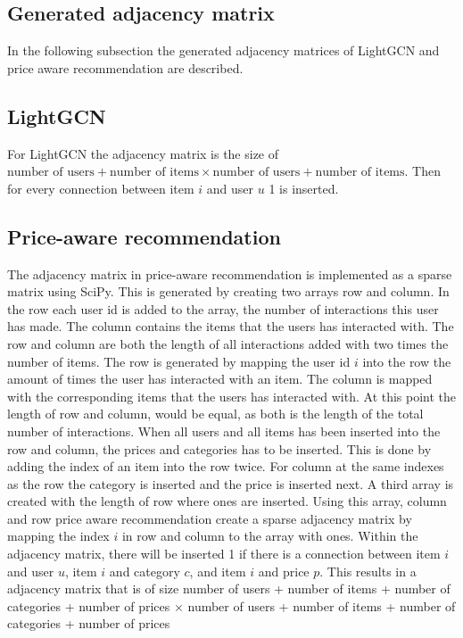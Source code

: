 \subsection{Generated adjacency matrix}
In the following subsection the generated adjacency matrices of LightGCN and price aware recommendation are described.

\subsection{LightGCN}
For LightGCN the adjacency matrix is the size of $\textrm{number of users} + \textrm{number of items} \times \textrm{number of users} + \textrm{number of items}$.
Then for every connection between item $i$ and user $u$ 1 is inserted.

\subsection{Price-aware recommendation}
The adjacency matrix in price-aware recommendation is implemented as a sparse matrix using SciPy.
This is generated by creating two arrays row and column.
In the row each user id is added to the array, the number of interactions this user has made.
The column contains the items that the users has interacted with.
The row and column are both the length of all interactions added with two times the number of items.
The row is generated by mapping the user id $i$ into the row the amount of times the user has interacted with an item.
The column is mapped with the corresponding items that the users has interacted with.
At this point the length of row and column, would be equal, as both is the length of the total number of interactions.
When all users and all items has been inserted into the row and column, the prices and categories has to be inserted.
This is done by adding the index of an item into the row twice.
For column at the same indexes as the row the category is inserted and the price is inserted next.
A third array is created with the length of row where ones are inserted.
Using this array, column and row price aware recommendation create a sparse adjacency matrix by mapping the index $i$ in row and column to the array with ones.
Within the adjacency matrix, there will be inserted 1 if there is a connection between item $i$ and user $u$, item $i$ and category $c$, and item $i$ and price $p$.
This results in a adjacency matrix that is of size number of users + number of items + number of categories + number of prices $\times$ number of users + number of items + number of categories + number of prices
